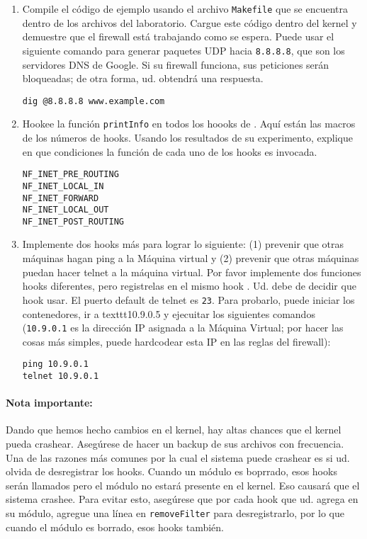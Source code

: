 \begin{enumerate}
	
\item Compile el código de ejemplo usando el archivo \texttt{Makefile} que se encuentra dentro de los archivos del laboratorio.
	Cargue este código dentro del kernel y demuestre que el firewall está trabajando como se espera. Puede usar el siguiente comando para generar paquetes UDP hacia \texttt{8.8.8.8}, que son los servidores DNS de Google. Si su firewall funciona, sus peticiones serán bloqueadas; de otra forma, ud. obtendrá una respuesta.

\begin{lstlisting}
dig @8.8.8.8 www.example.com 
\end{lstlisting}
 
\item Hookee la función \texttt{printInfo} en todos los hoooks de \netfilter. Aquí están las macros de los números de hooks. 
Usando los resultados de su experimento, explique en que condiciones la función de cada uno de los hooks es invocada.

\begin{lstlisting}
NF_INET_PRE_ROUTING 
NF_INET_LOCAL_IN        
NF_INET_FORWARD 
NF_INET_LOCAL_OUT 
NF_INET_POST_ROUTING    
\end{lstlisting}


\item Implemente dos hooks más para lograr lo siguiente:
(1) prevenir que otras máquinas hagan ping a la Máquina virtual y (2) prevenir que otras máquinas puedan hacer telnet a la máquina virtual.
Por favor implemente dos funciones hooks diferentes, pero registrelas en el mismo hook \netfilter. Ud. debe de decidir que hook usar.
El puerto default de telnet es \texttt{23}. Para probarlo, puede iniciar los contenedores, ir a texttt{10.9.0.5} y ejecuitar los siguientes comandos (\texttt{10.9.0.1} es la dirección IP asignada a la Máquina Virtual; por hacer las cosas más simples, puede hardcodear esta IP en las reglas del firewall):

 
\begin{lstlisting}
ping 10.9.0.1
telnet 10.9.0.1
\end{lstlisting}
     
\end{enumerate}
 

\paragraph{Nota importante:} Dando que hemos hecho cambios en el kernel, hay altas chances que el kernel pueda crashear. Asegúrese de hacer un backup de sus archivos con frecuencia. Una de las razones más comunes por la cual el sistema puede crashear es si ud. olvida de desregistrar los hooks. Cuando un módulo es boprrado, esos hooks serán llamados pero el módulo no estará presente en el kernel. Eso causará que el sistema crashee.
Para evitar esto, asegúrese que por cada hook que ud. agrega en su módulo, agregue una línea en \texttt{removeFilter} para desregistrarlo, por lo que cuando el módulo es borrado, esos hooks también.


